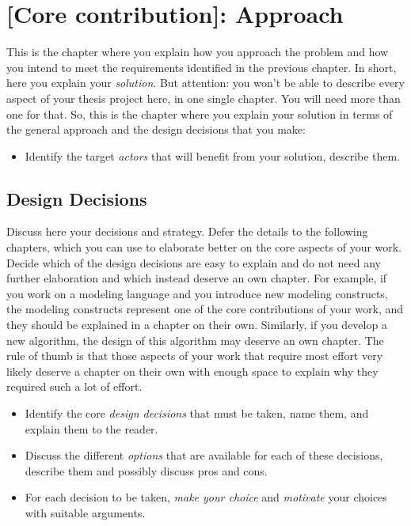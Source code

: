 \chapter{[Core contribution]: Approach}
\label{capitolo4}
\thispagestyle{empty}

This is the chapter where you explain how you approach the problem and how you intend to meet the requirements identified in the previous chapter. In short, here you explain your \emph{solution}. But attention: you won't be able to describe every aspect of your thesis project here, in one single chapter. You will need more than one for that. So, this is the chapter where you explain your solution in terms of the general approach and the design decisions that you make:

\begin{itemize}
\item[\Square] Identify the target \emph{actors} that will benefit from your solution, describe them.
\end{itemize}


\section{Design Decisions}
Discuss here your decisions and strategy. Defer the details to the following chapters, which you can use to elaborate better on the core aspects of your work. Decide which of the design decisions are easy to explain and do not need any further elaboration and which instead deserve an own chapter. For example, if you work on a modeling language and you introduce new modeling constructs, the modeling constructs represent one of the core contributions of your work, and they should be explained in a chapter on their own. Similarly, if you develop a new algorithm, the design of this algorithm may deserve an own chapter. The rule of thumb is that those aspects of your work that require most effort very likely deserve a chapter on their own with enough space to explain why they required such a lot of effort.

\begin{itemize}
\item[\Square] Identify the core \emph{design decisions} that must be taken, name them, and explain them to the reader.
\item[\Square] Discuss the different \emph{options} that are available for each of these decisions, describe them and possibly discuss pros and cons.
\item[\Square] For each decision to be taken, \emph{make your choice} and \emph{motivate} your choices with suitable arguments. 
\end{itemize}



